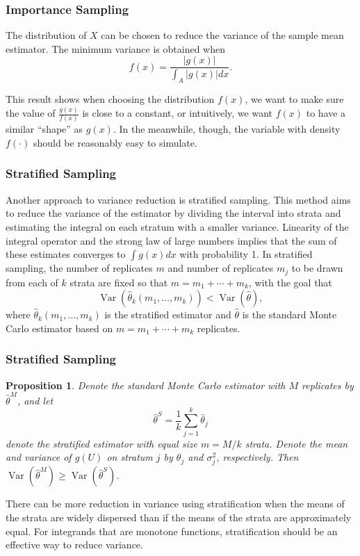 \documentclass{beamer}
\newtheorem{proposition}{Proposition}
\begin{document}
\begin{frame}[fragile]
\frametitle{Importance Sampling}

The distribution of $X$ can be chosen to reduce the variance of the sample mean estimator. The minimum variance is obtained when
\[
f(x)=\frac{|g(x)|}{\int_{A}|g(x)| dx}.
\]

This result shows when choosing the distribution $f(x)$, we want to make sure the value of $\frac{g(x)}{f(x)}$ is close to a constant, or intuitively, we want $f(x)$ to have a similar ``shape'' as $g(x)$.
In the meanwhile, though, the variable with density $f(\cdot)$ should be reasonably easy to simulate.
\end{frame}

\begin{frame}[fragile]
\frametitle{Stratified Sampling}

Another approach to variance reduction is stratified sampling. This method aims to reduce the variance of the estimator by dividing the interval into strata and estimating the integral on each stratum with a smaller variance. Linearity of the integral operator and the strong law of large numbers implies that the sum of these estimates converges to $\int g(x) d x$ with probability 1. In stratified sampling, the number of replicates $m$ and number of replicates $m_{j}$ to be drawn from each of $k$ strata are fixed so that $m=m_{1}+\cdots+m_{k}$, with the goal that
\[
\operatorname{Var}\left(\widehat{\theta}_{k}\left(m_{1}, \ldots, m_{k}\right)\right)<\operatorname{Var}\left(\widehat{\theta}\right),
\]
where $\widehat{\theta}_{k}\left(m_{1}, \ldots, m_{k}\right)$ is the stratified estimator and $\widehat{\theta}$ is the standard Monte Carlo estimator based on $m=m_{1}+\cdots+m_{k}$ replicates.
\end{frame}

\begin{frame}[fragile]
\frametitle{Stratified Sampling}

\begin{proposition}
Denote the standard Monte Carlo estimator with $M$ replicates by $\widehat{\theta}^{M}$, and let
\[
\widehat{\theta}^{S}=\frac{1}{k} \sum_{j=1}^{k} \widehat{\theta}_{j}
\]
denote the stratified estimator with equal size $m=M / k$ strata. Denote the mean and variance of $g(U)$ on stratum $j$ by $\theta_{j}$ and $\sigma_{j}^{2}$, respectively. Then $\operatorname{Var}\left(\widehat{\theta}^{M}\right) \geq \operatorname{Var}\left(\widehat{\theta}^{S}\right)$.
\end{proposition}

There can be more reduction in variance using stratification when the means of the strata are widely dispersed than if the means of the strata are approximately equal. For integrands that are monotone functions, stratification should be an effective way to reduce variance.
\end{frame}
\end{document}
